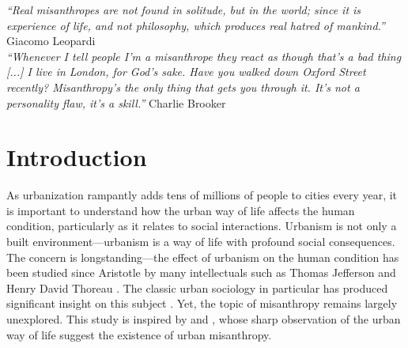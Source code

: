 \documentclass[11pt, letterpaper]{article}
\newcommand{\emd}[1]{\ExecuteMetaData[/tmp/tex]{#1}} %
\begin{document}

\begin{spacing}{1.4} %
\vspace{.25in}


{\small\it \noindent ``Real misanthropes are not found in solitude, but in the world; since it is experience of life, and not philosophy, which produces real hatred of mankind.''} Giacomo Leopardi\\

{\small\it \noindent ``Whenever I tell people I'm a misanthrope they react as
  though that's a bad thing [...] I live in London, for God's sake. Have you
  walked down Oxford Street recently? Misanthropy's the only thing that gets you
  through it. It's not a personality flaw, it's a skill.''} Charlie Brooker\\


\newpage

\section*{Introduction}

\noindent As urbanization rampantly adds tens of millions of people to cities every year, it is important to understand how the urban way of life affects the human condition, particularly as it relates to social interactions.
 Urbanism is not only a built environment---urbanism is a way of life with profound social consequences. 
The concern is longstanding---the effect of urbanism on the human condition has
been studied since Aristotle \citep{jowett1920aristotle} by many intellectuals
such as Thomas Jefferson and Henry David Thoreau \citep{white77}. The classic urban sociology in particular has produced significant insight on this subject \citep{wirth38,tonnies57,simmel03}. Yet, the topic of misanthropy  remains largely unexplored. This study is inspired by \citet{amin06} and \citet{thrift05}, whose sharp observation of
the urban way of life suggest the existence of urban misanthropy. 


\end{spacing}
\end{document}
